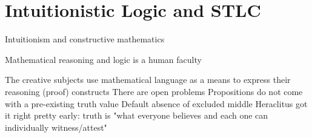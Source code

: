 \documentclass{beamer}
\begin{document}
\section{Intuitionistic Logic and STLC} 
\begin{frame}{Intuitionism and constructive mathematics}
  \begin{outline}
    
    
  \1[] Mathematical reasoning and logic is a human faculty
  
  \2[!] The creative subjects use mathematical language 
  as a means to express their reasoning (proof) constructs
  \2[!] 
  There are open problems
  \2[!] 
  Propositions do not come with a pre-existing truth value
  \3[!!] 
  Default absence of excluded middle
  \1[] Heraclitus got it right pretty early: truth is  "what everyone believes and each one can individually witness/attest"
\end{outline}
\end{frame}
\end{document}
